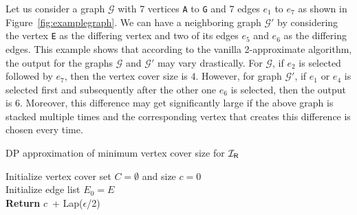\begin{example}
Let us consider a graph $\mathcal{G}$ with 7 vertices {\tt A} to {\tt G} and 7 edges $e_1$ to $e_7$ as shown in Figure~\ref{fig:examplegraph}. We can have a neighboring graph $\mathcal{G}'$ by considering the vertex {\tt E} as the differing vertex and two of its edges $e_5$ and $e_6$ as the differing edges. This example shows that according to the vanilla 2-approximate algorithm, the output for the graphs $\mathcal{G}$ and $\mathcal{G}'$ may vary drastically. For $\mathcal{G}$, if $e_2$ is selected followed by $e_7$, then the vertex cover size is 4. However, for graph $\mathcal{G}'$, if $e_1$ or $e_4$ is selected first and subsequently after the other one $e_6$ is selected, then the output is 6. Moreover, this difference may get significantly large if the above graph is stacked multiple times and the corresponding vertex that creates this difference is chosen every time. 
\label{example:naive_vertexcover}
\end{example}




\begin{algorithm}[t]
\caption{DP approximation of minimum vertex cover size for $\mathcal{I_\mathsf{R}}$}
\label{algo:dp_vertexcover}
    Initialize vertex cover set $C = \emptyset$ and size $c = 0$ \\
    Initialize edge list $E_0 = E$ \\
    {\bf Return} $c$\ + Lap($\epsilon$/2)
\end{algorithm}


